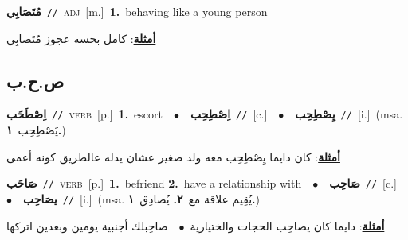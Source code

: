 \documentclass[10pt,a4paper,twoside]{article} %
\begin{document}
\begin{multicols}{2}
{\setlength\topsep{0pt}\textbf{\foreignlanguage{arabic}{مُتَصَابِي}}\ {\color{gray}\texttt{//}\color{black}}\ \textsc{adj}\ [m.]\ \textbf{1.}~behaving like a young person\  \begin{flushright}\color{gray}\foreignlanguage{arabic}{\textbf{\underline{\foreignlanguage{arabic}{أمثلة}}}: كامل بحسه عجوز مُتَصابِي}\end{flushright}\color{black}} \vspace{2mm}

\vspace{-3mm}
\subsection*{\color{blue}\foreignlanguage{arabic}{ص.ح.ب}\color{blue}{}} 

{\setlength\topsep{0pt}\textbf{\foreignlanguage{arabic}{اِصْطَحَب}}\ {\color{gray}\texttt{//}\color{black}}\ \textsc{verb}\ [p.]\ \textbf{1.}~escort\ \ $\bullet$\ \ \setlength\topsep{0pt}\textbf{\foreignlanguage{arabic}{اِصْطِحِب}}\ {\color{gray}\texttt{//}\color{black}}\ [c.]\ \ $\bullet$\ \ \setlength\topsep{0pt}\textbf{\foreignlanguage{arabic}{يِصْطِحِب}}\ {\color{gray}\texttt{//}\color{black}}\ [i.]\ \color{gray}(msa. \foreignlanguage{arabic}{يَصْطِحِب}~\foreignlanguage{arabic}{\textbf{١.}})\color{black}\  \begin{flushright}\color{gray}\foreignlanguage{arabic}{\textbf{\underline{\foreignlanguage{arabic}{أمثلة}}}: كان دايما يِصْطِحِب معه ولد صغير عشان يدله عالطريق كونه أعمى}\end{flushright}\color{black}} \vspace{2mm}

{\setlength\topsep{0pt}\textbf{\foreignlanguage{arabic}{صَاحَب}}\ {\color{gray}\texttt{//}\color{black}}\ \textsc{verb}\ [p.]\ \textbf{1.}~befriend  \textbf{2.}~have a relationship with\ \ $\bullet$\ \ \setlength\topsep{0pt}\textbf{\foreignlanguage{arabic}{صَاحِب}}\ {\color{gray}\texttt{//}\color{black}}\ [c.]\ \ $\bullet$\ \ \setlength\topsep{0pt}\textbf{\foreignlanguage{arabic}{يصَاحِب}}\ {\color{gray}\texttt{//}\color{black}}\ [i.]\ \color{gray}(msa. \foreignlanguage{arabic}{يُقِيم علاقة مع}~\foreignlanguage{arabic}{\textbf{٢.}}  \foreignlanguage{arabic}{يُصادِق}~\foreignlanguage{arabic}{\textbf{١.}})\color{black}\  \begin{flushright}\color{gray}\foreignlanguage{arabic}{\textbf{\underline{\foreignlanguage{arabic}{أمثلة}}}: دايما كان يصاحِب الحجات والختيارية\ $\bullet$\ \  صاحِبلك أجنبية يومين وبعدين اتركها}\end{flushright}\color{black}} \vspace{2mm}


\end{multicols}
\end{document}
